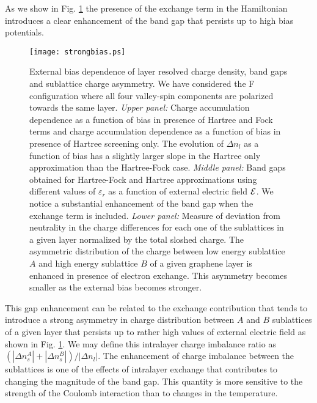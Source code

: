 \documentclass[twocolumn,prb,showpacs,preprintnumbers,amsmath,amssymb]{revtex4}
\begin{document}
As we show in Fig. \ref{strongbias} the presence of the exchange term in the
Hamiltonian introduces a clear enhancement of the band gap that persists up to high bias potentials.
\begin{figure}[htbp]
\begin{center}
\texttt{[image: strongbias.ps]} 
\caption{
External bias dependence of layer resolved charge density, band gaps and sublattice charge asymmetry.
We have considered the F configuration where all four valley-spin components are polarized towards the same layer. 
{\em Upper panel:}
Charge accumulation dependence as a function of bias in presence of Hartree and Fock terms
and charge accumulation dependence as a function of bias in presence of Hartree screening only.
The evolution of $\Delta n_l$ as a function of bias has a slightly larger slope in the Hartree only approximation 
than the Hartree-Fock case.
{\em Middle panel:}
Band gaps obtained for Hartree-Fock and Hartree approximations
using different values of $\varepsilon_r$ as a function of external electric field ${\cal E}$.
We notice a substantial enhancement of the band gap when the exchange term is included.
{\em Lower panel:}
Measure of deviation from neutrality in the charge differences for each one of the 
sublattices in a given layer normalized by the total sloshed charge.
The asymmetric distribution of the charge between low energy sublattice $A$ 
and high energy sublattice $B$ of a given graphene layer is enhanced in presence 
of electron exchange. This asymmetry becomes smaller as the external bias
becomes stronger.
}
\label{strongbias}
\end{center}
\end{figure}
This gap enhancement can be related to the exchange contribution that tends to 
introduce a strong asymmetry in charge distribution between $A$ and $B$ sublattices
of a given layer that persists up to rather high values of external electric field as shown
in Fig. \ref{strongbias}.
We may define this intralayer charge imbalance ratio as
$\left( \left| \Delta n_s^A \right| + \left| \Delta n_s^B \right| \right) / \left| \Delta n_l \right|$.
The enhancement of charge imbalance between the sublattices is one of the effects of 
intralayer exchange that contributes to changing the magnitude of the band gap.
This quantity is more sensitive to the strength of the Coulomb interaction 
than to changes in the temperature.
\end{document}
